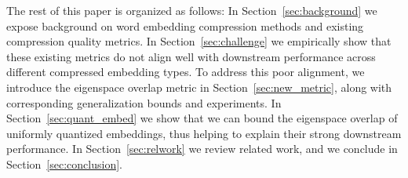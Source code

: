 The rest of this paper is organized as follows:
In Section~\ref{sec:background} we expose background on word embedding compression methods and existing compression quality metrics.
In Section~\ref{sec:challenge} we empirically show that these existing metrics do not align well with downstream performance across different compressed embedding types.
To address this poor alignment, we introduce the eigenspace overlap metric in Section~\ref{sec:new_metric}, along with corresponding generalization bounds and experiments.
In Section~\ref{sec:quant_embed} we show that we can bound the eigenspace overlap of uniformly quantized embeddings, thus helping to explain their strong downstream performance.
In Section~\ref{sec:relwork} we review related work, and we conclude in Section~\ref{sec:conclusion}.


%
%
